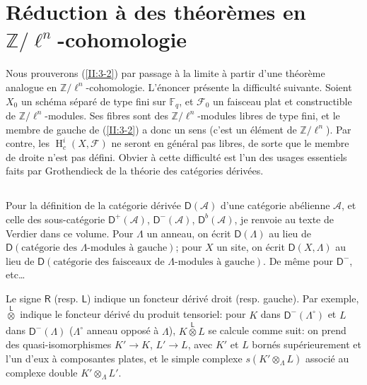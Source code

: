 \documentclass{book}
\DeclareMathOperator{\h}{H}
\newcommand{\cF}{\mathcal{F}}
\newcommand{\dF}{\mathbb{F}}
\newcommand{\dZ}{\mathbb{Z}}
\newcommand{\sA}{\mathscr{A}}
\newcommand{\R}{\mathsf{R}}
\newcommand{\D}{\mathsf{D}}
\newcommand{\lotimes}{{\overset{\mathsf{L}}{\otimes}}}
\begin{document}
\section{Réduction à des théorèmes en \texorpdfstring{$\dZ/\ell^n$}{Z/l n}-cohomologie}\label{II:4}

Nous prouverons (\ref{II:3-2}) par passage à la limite à partir d'une 
théorème analogue en $\dZ/\ell^n$-cohomologie. L'énoncer présente la 
difficulté suivante. Soient $X_0$ un schéma séparé de type fini sur 
$\dF_q$, et $\cF_0$ un faisceau plat et constructible de $\dZ/\ell^n$-modules. 
Ses fibres sont des $\dZ/\ell^n$-modules libres de type fini, et le membre de 
gauche de (\ref{II:3-2}) a donc un sens (c'est un élément de $\dZ/\ell^n$). 
Par contre, les $\h_c^i(X,\cF)$ ne seront en général pas libres, de sorte 
que le membre de droite n'est pas défini. Obvier à cette difficulté est 
l'un des usages essentiels faits par Grothendieck de la théorie des 
catégories dérivées.





\subsection{}\label{II:4-1}

Pour la définition de la catégorie dérivée $\D(\sA)$ d'une catégorie 
abélienne $\sA$, et celle des sous-catégorie $\D^+(\sA)$, $\D^-(\sA)$, 
$\D^b(\sA)$, je renvoie au texte de Verdier dans ce volume. Pour $\Lambda$ 
un anneau, on écrit $\D(\Lambda)$ au lieu de 
$\D(\text{catégorie des $\Lambda$-modules à gauche})$; pour $X$ un site, on 
écrit $\D(X,\Lambda)$ au lieu de 
$\D(\text{catégorie des faisceaux de $\Lambda$-modules à gauche})$. De 
même pour $\D^-$, etc\ldots

Le signe $\R$ (resp. $\mathsf{L}$) indique un foncteur dérivé droit (resp. 
gauche). Par exemple, $\lotimes$ indique le foncteur dérivé du produit 
tensoriel: pour $K$ dans $\D^-(\Lambda^\circ)$ et $L$ dans $\D^-(\Lambda)$ 
($\Lambda^\circ$ anneau opposé à $\Lambda$), $K\lotimes L$ se calcule 
comme suit: on prend des quasi-isomorphismes $K'\to K$, $L'\to L$, avec 
$K'$ et $L$ bornés supérieurement et l'un d'eux à composantes plates, et 
le simple complexe $s(K'\otimes_\Lambda L)$ associé au complexe double 
$K'\otimes_\Lambda L'$. 





\subsection{}\label{II:4-2}
\end{document}
